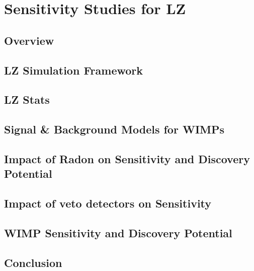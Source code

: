 \chapter{Sensitivity Studies for LZ}
\label{chap:chap5}

\section{Overview}

\section{LZ Simulation Framework}
\label{sec:LZ_simulation_framework}

\section{LZ Stats}
\label{sec:uclradonsystem}

\section{Signal \& Background Models for WIMPs}
\label{sec:uclradon}

\section{Impact of Radon on Sensitivity and Discovery Potential}
\label{sec:otherradon}

\section{Impact of veto detectors on Sensitivity}
\label{sec:lzradon}

\section{WIMP Sensitivity and Discovery Potential}
\label{sec:lzradon}

\section{Conclusion}